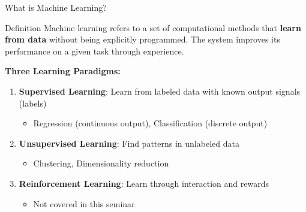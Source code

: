\documentclass[11pt]{beamer}
\begin{document}
\begin{frame}[fragile]{What is Machine Learning?}
	\begin{block}{Definition}
		Machine learning refers to a set of computational methods that \textbf{learn from data} without being explicitly programmed. The system improves its performance on a given task through experience.
	\end{block}

	\vspace{0.3cm}

	\textbf{Three Learning Paradigms:}
	\begin{enumerate}
		\setlength{\itemsep}{0.2cm}
		\item \textbf{Supervised Learning}: Learn from labeled data with known output signals (labels)
		      \begin{itemize}
			      \small
			      \item Regression (continuous output), Classification (discrete output)
		      \end{itemize}
		\item \textbf{Unsupervised Learning}: Find patterns in unlabeled data
		      \begin{itemize}
			      \small
			      \item Clustering, Dimensionality reduction
		      \end{itemize}
		\item \textbf{Reinforcement Learning}: Learn through interaction and rewards
		      \begin{itemize}
			      \small
			      \item Not covered in this seminar
		      \end{itemize}
	\end{enumerate}
\end{frame}
\end{document}
